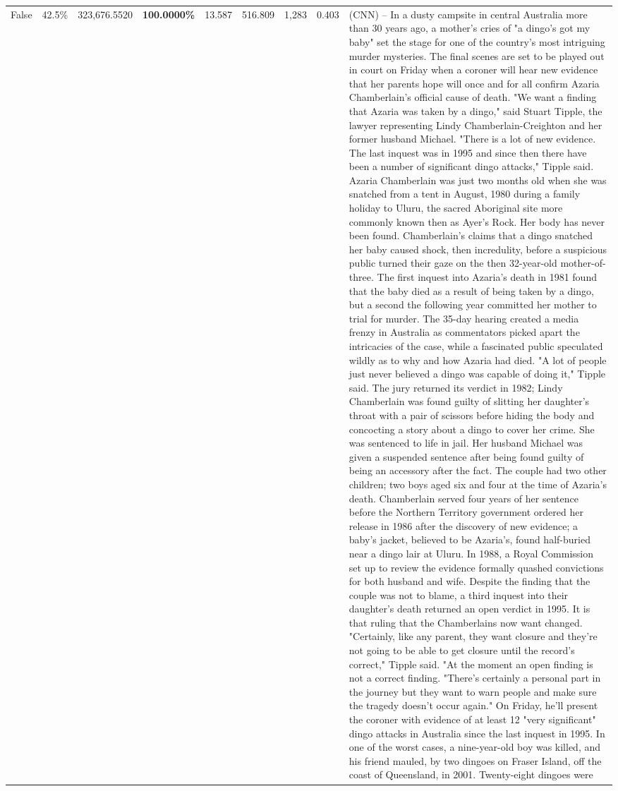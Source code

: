 \begin{table}[H]
\begin{tabular}{lllrlllll}
False & 42.5\% & 323,676.5520 & \bfseries \color{red} 100.0000\% & 13.587 & 516.809 & 1,283 & 0.403 & (CNN) -- In a dusty campsite in central Australia more than 30 years ago, a mother's cries of "a dingo's got my baby" set the stage for one of the country's most intriguing murder mysteries. The final scenes are set to be played out in court on Friday when a coroner will hear new evidence that her parents hope will once and for all confirm Azaria Chamberlain's official cause of death. "We want a finding that Azaria was taken by a dingo," said Stuart Tipple, the lawyer representing Lindy Chamberlain-Creighton and her former husband Michael. "There is a lot of new evidence. The last inquest was in 1995 and since then there have been a number of significant dingo attacks," Tipple said. Azaria Chamberlain was just two months old when she was snatched from a tent in August, 1980 during a family holiday to Uluru, the sacred Aboriginal site more commonly known then as Ayer's Rock. Her body has never been found. Chamberlain's claims that a dingo snatched her baby caused shock, then incredulity, before a suspicious public turned their gaze on the then 32-year-old mother-of-three. The first inquest into Azaria's death in 1981 found that the baby died as a result of being taken by a dingo, but a second the following year committed her mother to trial for murder. The 35-day hearing created a media frenzy in Australia as commentators picked apart the intricacies of the case, while a fascinated public speculated wildly as to why and how Azaria had died. "A lot of people just never believed a dingo was capable of doing it," Tipple said. The jury returned its verdict in 1982; Lindy Chamberlain was found guilty of slitting her daughter's throat with a pair of scissors before hiding the body and concocting a story about a dingo to cover her crime. She was sentenced to life in jail. Her husband Michael was given a suspended sentence after being found guilty of being an accessory after the fact. The couple had two other children; two boys aged six and four at the time of Azaria's death. Chamberlain served four years of her sentence before the Northern Territory government ordered her release in 1986 after the discovery of new evidence; a baby's jacket, believed to be Azaria's, found half-buried near a dingo lair at Uluru. In 1988, a Royal Commission set up to review the evidence formally quashed convictions for both husband and wife. Despite the finding that the couple was not to blame, a third inquest into their daughter's death returned an open verdict in 1995. It is that ruling that the Chamberlains now want changed. "Certainly, like any parent, they want closure and they're not going to be able to get closure until the record's correct," Tipple said. "At the moment an open finding is not a correct finding. "There's certainly a personal part in the journey but they want to warn people and make sure the tragedy doesn't occur again." On Friday, he'll present the coroner with evidence of at least 12 "very significant" dingo attacks in Australia since the last inquest in 1995. In one of the worst cases, a nine-year-old boy was killed, and his friend mauled, by two dingoes on Fraser Island, off the coast of Queensland, in 2001. Twenty-eight dingoes were 
\end{tabular}
\end{table}
